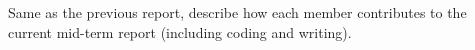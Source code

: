 Same as the previous report, describe how each member contributes to the current mid-term report (including coding and writing).